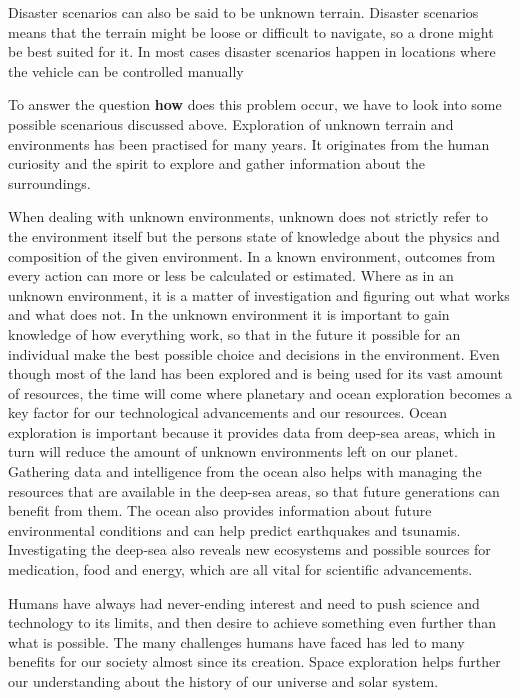 Disaster scenarios can also be said to be unknown terrain. Disaster scenarios means that the terrain might be loose or difficult to navigate, so a drone might be best suited for it. In most cases disaster scenarios happen in locations where the vehicle can be controlled manually

To answer the question \textbf{how} does this problem occur, we have to look into some possible scenarious discussed above. Exploration of unknown terrain and environments has been practised for many years. It originates from the human curiosity and the spirit to explore and gather information about the surroundings.

When dealing with unknown environments, unknown does not strictly refer to the environment itself but the persons state of knowledge about the physics and composition of the given environment. In a known environment, outcomes from every action can more or less be calculated or estimated. Where as in an unknown environment, it is a matter of investigation and figuring out what works and what does not. In the unknown environment it is important to gain knowledge of how everything work, so that in the future it possible for an individual make the best possible choice and decisions in the environment.\cite{aiint}
Even though most of the land has been explored and is being used for its vast amount of resources, the time will come where planetary and ocean exploration becomes a key factor for our technological advancements and our resources. Ocean exploration is important because it provides data from deep-sea areas, which in turn will reduce the amount of unknown environments left on our planet.
Gathering data and intelligence from the ocean also helps with managing the resources that are available in the deep-sea areas, so that future generations can benefit from them. The ocean also provides information about future environmental conditions and can help predict earthquakes and tsunamis. Investigating the deep-sea also reveals new ecosystems and possible sources for medication, food and energy, which are all vital for scientific advancements.\cite{oceanexplo}

Humans have always had never-ending interest and need to push science and technology to its limits, and then desire to achieve something even further than what is possible.  The many challenges humans have faced has led to many benefits for our society almost since its creation. Space exploration helps further our understanding about the history of our universe and solar system.\cite{whyweexplo}

